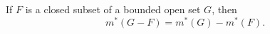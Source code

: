 \begin{lemma}[Lemma 3.7]
If $F$ is a closed subset of a bounded open set $G$, then
$$
m^*(G - F) = m^*(G) - m^*(F).
$$
\end{lemma}
